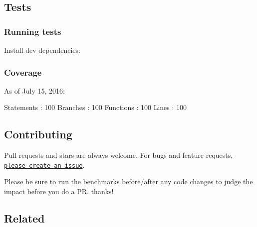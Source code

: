 \subsection*{Tests}

\subsubsection*{Running tests}

Install dev dependencies\+:




\subsubsection*{Coverage}

As of July 15, 2016\+:


\begin{DoxyCode}
Statements : 100%
Branches   : 100%
Functions  : 100%
Lines      : 100%
\end{DoxyCode}


\subsection*{Contributing}

Pull requests and stars are always welcome. For bugs and feature requests, \href{../../issues/new}{\tt please create an issue}.

Please be sure to run the benchmarks before/after any code changes to judge the impact before you do a PR. thanks!

\subsection*{Related}


